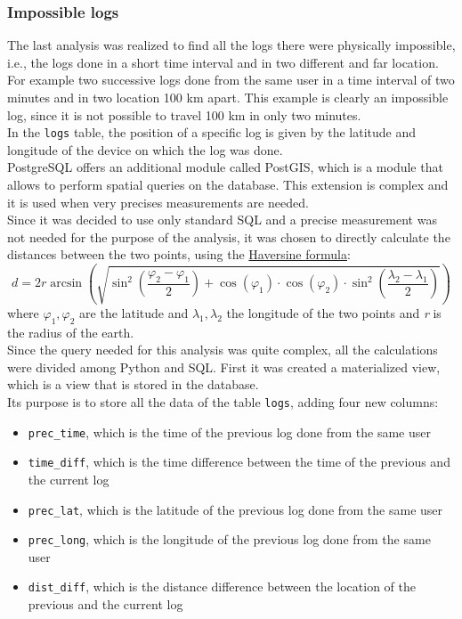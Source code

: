 \documentclass[12pt, a4paper, oneside]{article}
\begin{document}
\subsubsection{Impossible logs}
The last analysis was realized to find all the logs there were physically impossible, i.e., the logs done in a short time interval and in two different and far location.
For example two successive logs done from the same user in a time interval of two minutes and in two location 100 km apart. This example is clearly an impossible log, since it is not possible to travel 100 km
in only two minutes.\\
In the \texttt{logs} table, the position of a specific log is given by the latitude and longitude of the device on which the log was done.\\
PostgreSQL offers an additional module called PostGIS, which is a module that allows to perform spatial queries on the database. This extension is complex and it is used when very precises measurements are
needed.\\
Since it was decided to use only standard SQL and a precise measurement was not needed for the purpose of the analysis, it was chosen to directly calculate the distances between the two points, using the
\href{https://en.wikipedia.org/wiki/Haversine_formula}{Haversine formula}:
\[
    d = 2r\arcsin \left( \sqrt{ \sin^2\left(\frac{\varphi_2 - \varphi_1} {2}\right) + \cos(\varphi_1)\cdot\cos(\varphi_2) \cdot \sin^2\left(\frac{\lambda_2 - \lambda_1} {2}\right) } \right)
\]
where $\varphi_1, \varphi_2$ are the latitude and $\lambda_1, \lambda_2$ the longitude of the two points and \emph{r} is the radius of the earth.\\
Since the query needed for this analysis was quite complex, all the calculations were divided among Python and SQL.
First it was created a materialized view, which is a view that is stored in the database.\\ Its purpose is to store all the data of the table \texttt{logs}, adding four new columns:
\begin{itemize}
    \item \texttt{prec\_time}, which is the time of the previous log done from the same user
    \item \texttt{time\_diff}, which is the time difference between the time of the previous and the current log
    \item \texttt{prec\_lat}, which is the latitude of the previous log done from the same user
    \item \texttt{prec\_long}, which is the longitude of the previous log done from the same user
    \item \texttt{dist\_diff}, which is the distance difference between the location of the previous and the current log
\end{itemize}
\end{document}
